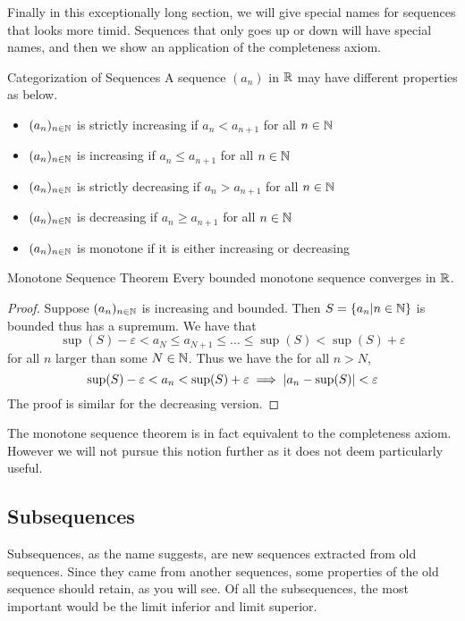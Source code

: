 \documentclass[a4paper]{article}
\begin{document}
Finally in this exceptionally long section, we will give special names for sequences that looks more timid. Sequences that only goes up or down will have special names, and then we show an application of the completeness axiom. 

\begin{defn}{Categorization of Sequences}{} A sequence $(a_n)$ in $\mathbb{R}$ may have different properties as below. 
\begin{itemize}
\item $(a_n)_{n\in\mathbb{N}}$ is strictly increasing if $a_n<a_{n+1}$ for all $n\in\mathbb{N}$
\item $(a_n)_{n\in\mathbb{N}}$ is increasing if $a_n\leq a_{n+1}$ for all $n\in\mathbb{N}$
\item $(a_n)_{n\in\mathbb{N}}$ is strictly decreasing if $a_n>a_{n+1}$ for all $n\in\mathbb{N}$
\item $(a_n)_{n\in\mathbb{N}}$ is decreasing if $a_n\geq a_{n+1}$ for all $n\in\mathbb{N}$
\item $(a_n)_{n\in\mathbb{N}}$ is monotone if it is either increasing or decreasing
\end{itemize}
\end{defn}

\begin{thm}{Monotone Sequence Theorem}{} Every bounded monotone sequence converges in $\mathbb{R}$. \tcbline
\begin{proof} Suppose $(a_n)_{n\in\mathbb{N}}$ is increasing and bounded. Then $S=\{a_n|n\in\mathbb{N}\}$ is bounded thus has a supremum. We have that $$\sup(S)-\varepsilon< a_N\leq a_{N+1}\leq\dots\leq\sup(S)<\sup(S)+\varepsilon$$ for all $n$ larger than some $N\in\mathbb{N}$. Thus we have the for all $n>N$, $$\sup(S)-\varepsilon<a_n<\sup(S)+\varepsilon\implies\abs{a_n-\sup(S)}<\varepsilon$$ The proof is similar for the decreasing version. 
\end{proof}
\end{thm}

The monotone sequence theorem is in fact equivalent to the completeness axiom. However we will not pursue this notion further as it does not deem particularly useful. 

\subsection{Subsequences}
Subsequences, as the name suggests, are new sequences extracted from old sequences. Since they came from another sequences, some properties of the old sequence should retain, as you will see. Of all the subsequences, the most important would be the limit inferior and limit superior. 
\end{document}
